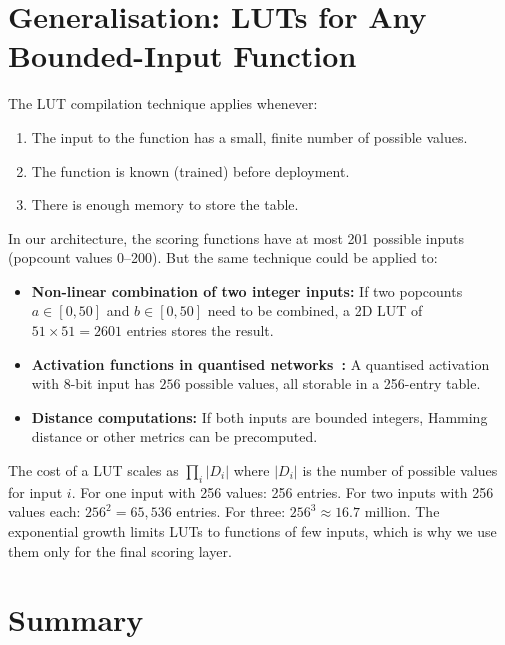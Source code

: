 \section{Generalisation: LUTs for Any Bounded-Input Function}
\label{sec:generalisation}

The LUT compilation technique applies whenever:
\begin{enumerate}
  \item The input to the function has a small, finite number of
    possible values.
  \item The function is known (trained) before deployment.
  \item There is enough memory to store the table.
\end{enumerate}

In our architecture, the scoring functions have at most 201 possible
inputs (popcount values 0--200). But the same technique could be
applied to:

\begin{itemize}
  \item \textbf{Non-linear combination of two integer inputs:}
    If two popcounts $a \in [0, 50]$ and $b \in [0, 50]$ need to be
    combined, a 2D LUT of $51 \times 51 = 2601$ entries stores the
    result.
  \item \textbf{Activation functions in quantised networks~\cite{hubara2017quantized}:} A
    quantised activation with 8-bit input has $256$ possible values,
    all storable in a 256-entry table.
  \item \textbf{Distance computations:} If both inputs are bounded
    integers, Hamming distance or other metrics can be precomputed.
\end{itemize}

The cost of a LUT scales as $\prod_i |D_i|$ where $|D_i|$ is the
number of possible values for input $i$. For one input with 256
values: 256 entries. For two inputs with 256 values each:
$256^2 = 65{,}536$ entries. For three: $256^3 \approx 16.7$ million.
The exponential growth limits LUTs to functions of few inputs, which
is why we use them only for the final scoring layer.


\section{Summary}
\label{sec:ch11-summary}

